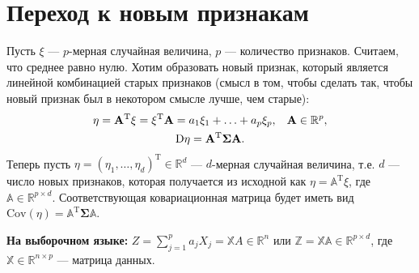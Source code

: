 \documentclass[specialist, 12pt,
subf, %
href, colorlinks=true,
substylefile = spbu.rtx,
]{disser}
\begin{document}
\section{Переход к новым признакам}
Пусть $\xi$ --- $p$-мерная случайная величина, $p$ --- количество признаков. Считаем, что среднее равно нулю. Хотим образовать новый признак, который является линейной комбинацией старых признаков (смысл в том, чтобы сделать так, чтобы новый признак был в некотором смысле лучше, чем старые):
\begin{gather*}
\eta = \mathbf{A}^{\mathrm{T}}\xi = \xi^{\mathrm{T}} \mathbf{A} = a_1 \xi_1 + \ldots + a_p \xi_p, \hspace{0.3 cm} \mathbf{A} \in \mathbb{R}^p,\\
\mathrm{D}\eta = \mathbf{A}^{\mathrm{T}} \mathbf{\Sigma} \mathbf{A}.
\end{gather*}
Теперь пусть $\eta = (\eta_1, \ldots, \eta_d)^{\mathrm{T}} \in \mathbb{R}^d$ --- $d$-мерная случайная величина, т.е. $d$ --- число новых признаков, которая получается из исходной как $\eta = \mathbb{A}^{\mathrm{T}} \xi$, где $\mathbb{A} \in \mathbb{R}^{p\times d}$. Соответствующая ковариационная матрица будет иметь вид $\mathrm{Cov} (\eta) = \mathbb{A}^{\mathrm{T}} \mathbf{\Sigma} \mathbb{A}$.

\textbf{На выборочном языке:} $Z = \sum\limits_{j = 1}^{p} a_j X_j = \mathbb{X} A \in \mathbb{R}^n$ или $\mathbb{Z} = \mathbb{X} \mathbb{A} \in \mathbb{R}^{p \times d}$, где $\mathbb{X} \in \mathbb{R}^{n \times p}$ --- матрица данных.
\\
\end{document}
